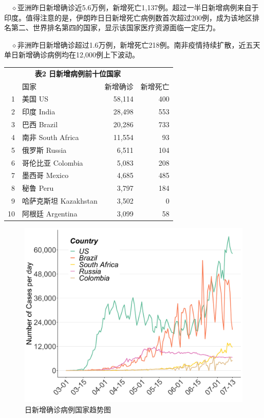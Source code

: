 \documentclass[]{article}
\begin{document}
\(\quad\)\(\diamond\)亚洲昨日新增确诊近5.6万例，新增死亡1,137例。超过一半日新增病例来自于印度。值得注意的是，伊朗昨日日新增死亡病例数首次超过200例，成为该地区排名第二、世界排名第四的国家，显示该国家医疗资源面临一定压力。

\(\quad\)\(\diamond\)非洲昨日新增确诊超过1.6万例，新增死亡218例。南非疫情持续扩散，近五天单日新增确诊病例均在12,000例上下波动。

\begin{table}[H]
    \centering \begin{table}[H]
\centering\begingroup\fontsize{20}{22}\selectfont

\begin{tabular}{rlrr}
\toprule
\multicolumn{0}{c}{\textbf{ }} & \multicolumn{2}{c}{\textbf{表2 日新增病例前十位国家}} \\
  & 国家 & 新增确诊 & 新增死亡\\
\midrule
\rowcolor{gray!6}  1 & 美国 US & 58,114 & 400\\
2 & 印度 India & 28,498 & 553\\
\rowcolor{gray!6}  3 & 巴西 Brazil & 20,286 & 733\\
4 & 南非 South Africa & 11,554 & 93\\
\rowcolor{gray!6}  5 & 俄罗斯 Russia & 6,511 & 104\\
6 & 哥伦比亚 Colombia & 5,083 & 208\\
\rowcolor{gray!6}  7 & 墨西哥 Mexico & 4,685 & 485\\
8 & 秘鲁 Peru & 3,797 & 184\\
\rowcolor{gray!6}  9 & 哈萨克斯坦 Kazakhstan & 3,502 & 0\\
10 & 阿根廷 Argentina & 3,099 & 58\\
\bottomrule
\end{tabular}
\endgroup{}
\end{table} \end{table}
\vspace{5mm}
\begin{figure}[H]
\centering
{}
\caption{日新增确诊病例国家趋势图}
\includegraphics[]{./input/covid2.png}
\end{figure}
\end{document}
